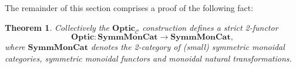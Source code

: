 \documentclass[11pt,letterpaper]{article}
\theoremstyle{plain}
\newtheorem{theorem}{Theorem}[subsection]
\theoremstyle{definition}
\newcommand{\C}{\mathscr{C}}
\newcommand{\SymmMonCat}{\mathbf{SymmMonCat}}
\newcommand{\Optic}{\mathbf{Optic}}
\newcommand{\todo}[1]{\textcolor{red}{\small #1}}
\begin{document}
The remainder of this section comprises a proof of the following fact:

\begin{theorem}\label{thm:optic-functor}
  Collectively the $\Optic_\C$ construction defines a strict 2-functor \[\Optic : \SymmMonCat \to \SymmMonCat,\] where $\SymmMonCat$ denotes the 2-category of (small) symmetric monoidal categories, symmetric monoidal functors and monoidal natural transformations.
\end{theorem}


\end{document}
